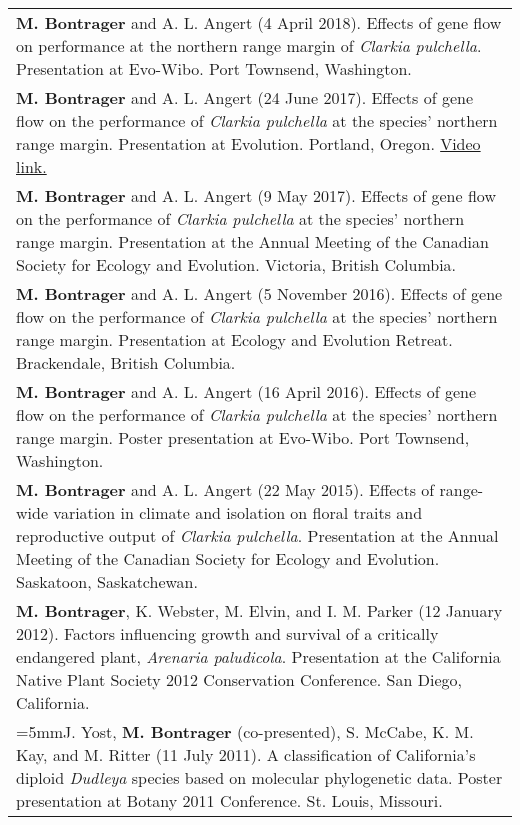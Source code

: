 \documentclass[letterpaper,11pt,oneside]{article}
\begin{document}
\begin{tabular}{@{} >{\raggedright\arraybackslash}p{17.2cm}}
\hangindent=5mm\textbf{M. Bontrager} and A. L. Angert (4 April 2018). Effects of gene flow on performance  at the northern range margin of \textit{Clarkia pulchella}. Presentation at Evo-Wibo. Port Townsend, Washington. \\
\hangindent=5mm\textbf{M. Bontrager} and A. L. Angert (24 June 2017). Effects of gene flow on the performance of \textit{Clarkia pulchella} at the species’ northern range margin. Presentation at Evolution. Portland, Oregon. \href{https://www.youtube.com/watch?v=HqVgQzIJLyA}{Video link.} \\
\hangindent=5mm\textbf{M. Bontrager} and A. L. Angert (9 May 2017). Effects of gene flow on the performance of \textit{Clarkia pulchella} at the species’ northern range margin. Presentation at the Annual Meeting of the Canadian Society for Ecology and Evolution. Victoria, British Columbia. \\
\hangindent=5mm\textbf{M. Bontrager} and A. L. Angert (5 November 2016). Effects of gene flow on the performance of \textit{Clarkia pulchella} at the species’ northern range margin. Presentation at Ecology and Evolution Retreat. Brackendale, British Columbia. \\
\hangindent=5mm\textbf{M. Bontrager} and A. L. Angert (16 April 2016). Effects of gene flow on the performance of \textit{Clarkia pulchella} at the species’ northern range margin. Poster presentation at Evo-Wibo. Port Townsend, Washington. \\
\hangindent=5mm\textbf{M. Bontrager} and A. L. Angert (22 May 2015). Effects of range-wide variation in climate and isolation on floral traits and reproductive output of \textit{Clarkia pulchella}. Presentation at the Annual Meeting of the Canadian Society for Ecology and Evolution. Saskatoon, Saskatchewan. \\
\hangindent=5mm\textbf{M. Bontrager}, K. Webster, M. Elvin, and I. M. Parker (12 January 2012). Factors influencing growth and survival of a critically endangered plant, \textit{Arenaria paludicola}. Presentation at the California Native Plant Society 2012 Conservation Conference. San Diego, California. \\
\hangindent=5mmJ. Yost, \textbf{M. Bontrager} (co-presented), S. McCabe, K. M. Kay, and M. Ritter (11 July 2011). A classification of California’s diploid \textit{Dudleya} species based on molecular phylogenetic data. Poster presentation at Botany 2011 Conference. St. Louis, Missouri. \\
\end{tabular}
\bigskip
\end{document}
